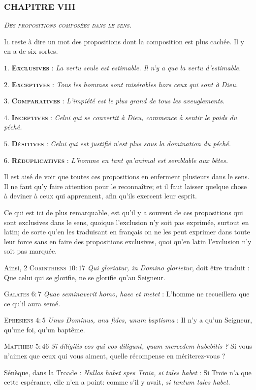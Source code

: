 \subsubsection{\centering \Large CHAPITRE VIII}
\begin{center}\emph{\large\scshape Des propositions composées dans le sens.}\end{center}

	\lettrine{I}{l} reste à dire un mot des propositions dont la composition est plus cachée. Il y en a de six sortes.

	\bigbreak
$1$. {\bfseries\scshape Exclusives} : \emph{La vertu seule est estimable. Il n'y a que la vertu d'estimable.}

$2$. {\bfseries\scshape Exceptives} : \emph{Tous les hommes sont misérables hors ceux qui sont à Dieu.}

$3$. {\bfseries\scshape Comparatives} : \emph{L'impiété est le plus grand de tous les aveuglements.}

$4$. {\bfseries\scshape Inceptives} : \emph{Celui qui se convertit à Dieu, commence à sentir le poids du péché.}

$5$. {\bfseries\scshape Désitives} : \emph{Celui qui est justifié n'est plus sous la domination du péché.}

$6$. {\bfseries\scshape Réduplicatives} : \emph{L'homme en tant qu'animal est semblable aux bêtes.}

\bigbreak
Il est aisé de voir que toutes ces propositions en enferment plusieurs dans le sens. Il ne faut qu'y faire attention pour le reconnaître; et il faut laisser quelque chose à deviner à ceux qui apprennent, afin qu'ils exercent leur esprit.

Ce qui est ici de plus remarquable, est qu'il y a souvent de ces propositions qui sont exclusives dans le sens, quoique l'exclusion n'y soit pas exprimée, surtout en latin; de sorte qu'en les traduisant en français on ne les peut exprimer dans toute leur force sans en faire des propositions exclusives, quoi qu'en latin l'exclusion n'y soit pas marquée.

Ainsi, {\scshape $2$ Corinthiens $10:17$} \emph{Qui gloriatur, in Domino glorietur}, doit être traduit : Que celui qui se glorifie, ne se glorifie qu'au Seigneur.

{\scshape Galates $6:7$} \emph{Quae seminaverit homo, haec et metet} : L'homme ne recueillera que ce qu'il aura semé.

{\scshape Ephesiens $4:5$} \emph{Unus Dominus, una fides, unum baptisma} : Il n'y a qu'un Seigneur, qu'une foi, qu'un baptême.

{\scshape Matthieu $5:46$} \emph{Si diligitis eos qui vos diligunt, quam mercedem habebitis ?} Si vous n'aimez que ceux qui vous aiment, quelle récompense en mériterez-vous ?

Sénèque, dans la Troade : \emph{Nullas habet spes Troia, si tales habet} : Si Troie n'a que cette espérance, elle n'en a point: comme s'il y avait, \emph{si tantum tales habet}.

